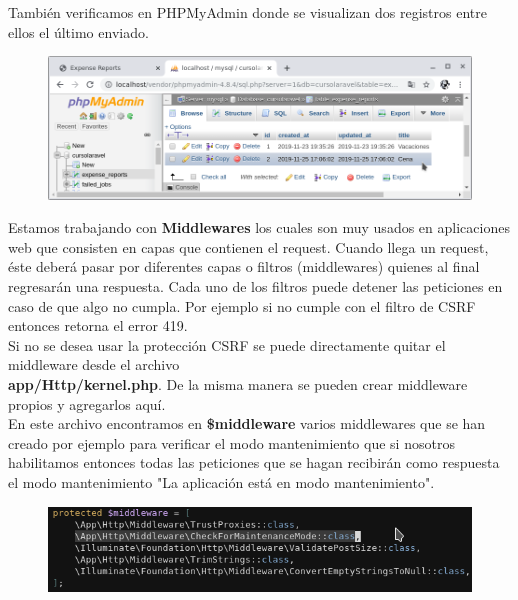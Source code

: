 \documentclass{article}
\begin{document}
También verificamos en PHPMyAdmin donde se visualizan dos registros entre ellos
el último enviado.\\

\begin{figure}[h!]
  \centering
  \includegraphics[scale=0.5]{./Pictures/067_bd_ok.png}
\end{figure}

Estamos trabajando con \textbf{Middlewares} los cuales son muy usados en
aplicaciones web que consisten en capas que contienen el request. Cuando llega
un request, éste deberá pasar por diferentes capas o filtros (middlewares)
quienes al final regresarán una respuesta. Cada uno de los filtros puede
detener las peticiones en caso de que algo no cumpla. Por ejemplo si no cumple
con el filtro de CSRF entonces retorna el error 419.\\

Si no se desea usar la protección CSRF se puede directamente quitar el
middleware desde el archivo\\
\textbf{app/Http/kernel.php}. De la misma manera se pueden crear middleware
propios y agregarlos aquí.\\

En este archivo encontramos en \textbf{\$middleware} varios middlewares que se
han creado por ejemplo para verificar el modo mantenimiento que si nosotros
habilitamos entonces todas las peticiones que se hagan recibirán como respuesta
el modo mantenimiento "La aplicación está en modo mantenimiento".

\begin{figure}[h!]
  \centering
  \includegraphics[scale=0.75]{./Pictures/069_middlewareMaintenanceMode.png}
\end{figure}
\end{document}
